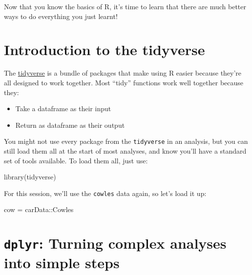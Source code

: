 \documentclass[
]{book}
\newenvironment{Shaded}{\begin{snugshade}}{\end{snugshade}}
\newcommand{\FunctionTok}[1]{\textcolor[rgb]{0.00,0.00,0.00}{#1}}
\newcommand{\NormalTok}[1]{#1}
\newcommand{\OtherTok}[1]{\textcolor[rgb]{0.56,0.35,0.01}{#1}}
\newcommand{\SpecialCharTok}[1]{\textcolor[rgb]{0.00,0.00,0.00}{#1}}
\providecommand{\tightlist}{%
  \setlength{\itemsep}{0pt}\setlength{\parskip}{0pt}}
\begin{document}
Now that you know the basics of R, it's time to learn that there
are much better ways to do everything you just learnt!

\hypertarget{introduction-to-the-tidyverse}{%
\section{Introduction to the tidyverse}\label{introduction-to-the-tidyverse}}

The \href{https://www.tidyverse.org/}{tidyverse} is a bundle of packages that
make using R easier because they're all designed to work together. Most
``tidy'' functions work well together because they:

\begin{itemize}
\tightlist
\item
  Take a dataframe as their input
\item
  Return as dataframe as their output
\end{itemize}

You might not use every package from the \texttt{tidyverse} in an analysis,
but you can still load them all at the start of most analyses, and
know you'll have a standard set of tools available. To load
them all, just use:

\begin{Shaded}
\begin{Highlighting}[]
\FunctionTok{library}\NormalTok{(tidyverse)}
\end{Highlighting}
\end{Shaded}

For this session, we'll use the \texttt{cowles} data again, so let's
load it up:

\begin{Shaded}
\begin{Highlighting}[]
\NormalTok{cow }\OtherTok{=}\NormalTok{ carData}\SpecialCharTok{::}\NormalTok{Cowles}
\end{Highlighting}
\end{Shaded}

\hypertarget{dplyr-turning-complex-analyses-into-simple-steps}{%
\section{\texorpdfstring{\texttt{dplyr}: Turning complex analyses into simple steps}{dplyr: Turning complex analyses into simple steps}}\label{dplyr-turning-complex-analyses-into-simple-steps}}
\end{document}
